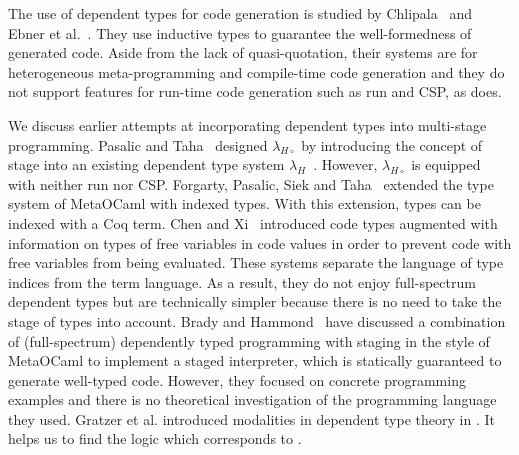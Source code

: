 




The use of dependent types for code generation is studied by
Chlipala~\cite{chlipala2010ur} and Ebner et
al.~\cite{DBLP:journals/pacmpl/EbnerURAM17}.  They use inductive types to
guarantee the well-formedness of generated code.  Aside from the lack of
quasi-quotation, their systems are for heterogeneous meta-programming and
compile-time code generation and they do not support features for run-time code
generation such as run and CSP, as \LMD{} does.


We discuss earlier attempts at incorporating dependent types into multi-stage
programming.  Pasalic and Taha~\cite{pasalic2002tagless} designed
\(\lambda_{H\circ}\) by introducing the concept of stage into an existing
dependent type system \(\lambda_H\)~\cite{zhong2002certified}.  However,
\(\lambda_{H\circ}\) is equipped with neither run nor CSP.  Forgarty, Pasalic,
Siek and Taha~\cite{fogarty2007concoqtion} extended the type system of
MetaOCaml with indexed types.  With this extension, types can be indexed with a
Coq term.  Chen and Xi~\cite{chen2003meta} introduced code types augmented with
information on types of free variables in code values in order to prevent code
with free variables from being evaluated.  These systems separate the language
of type indices from the term language.  As a result, they do not enjoy
full-spectrum dependent types but are technically simpler because there is no
need to take the stage of types into account.  Brady and
Hammond~\cite{brady2006dependently} have discussed a combination of
(full-spectrum) dependently typed programming with staging in the style of
MetaOCaml to implement a staged interpreter, which is statically guaranteed to
generate well-typed code.  However, they focused on concrete programming
examples and there is no theoretical investigation of the programming language
they used. Gratzer et al. introduced modalities in dependent type theory in
\cite{gratzer2019modaldependent}. It helps us to find the logic which
corresponds to \LMD.

